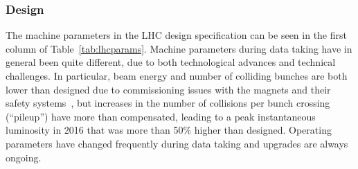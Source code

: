 \subsubsection{Design}
The machine parameters in the LHC design specification can be seen in the first column of Table~\ref{tab:lhcparams}.
Machine parameters during data taking have in general been quite different, due to both technological advances and technical challenges.
In particular, beam energy and number of colliding bunches are both lower than designed due to commissioning issues with the magnets and their safety systems~\cite{Bajko:1168025}, but increases in the number of collisions per bunch crossing (``pileup'') have more than compensated, leading to a peak instantaneous luminosity in 2016 that was more than 50\% higher than designed.
Operating parameters have changed frequently during data taking and upgrades are always ongoing.


